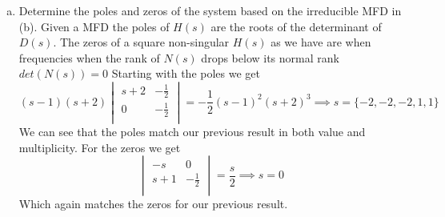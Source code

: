 \documentclass{article}
\begin{document}
\begin{enumerate}[(a)]
\item Determine the poles and zeros of the system based on the irreducible MFD in (b).
\newline
Given a MFD the poles of $H(s)$ are the roots of the determinant of $D(s)$.
The zeros of a square non-singular $H(s)$ as we have are when frequencies when the rank of $N(s)$ drops below its normal rank $det(N(s)) = 0$
\newline
Starting with the poles we get
$$
(s-1)(s+2)
\begin{vmatrix}
s+2 & -\frac{1}{2} \\
0 & -\frac{1}{2} \\
\end{vmatrix}
=
-\frac{1}{2}(s-1)^2(s+2)^3
\implies s = \{-2,-2,-2,1,1\}
$$
We can see that the poles match our previous result in both value and multiplicity.
\newline
For the zeros we get
$$
\begin{vmatrix}
-s & 0 \\
s+1 & -\frac{1}{2} \\
\end{vmatrix}
= \frac{s}{2}
\implies s = 0
$$
Which again matches the zeros for our previous result.
\newline
{}


\end{enumerate}
\end{document}
